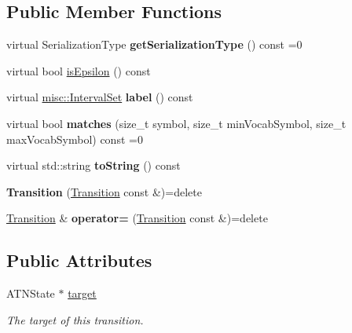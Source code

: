 \subsection*{Public Member Functions}
\begin{DoxyCompactItemize}
\item 
\mbox{\label{classantlr4_1_1atn_1_1Transition_a9a850c39a688cf755a1983342a67ec22}} 
virtual Serialization\+Type {\bfseries get\+Serialization\+Type} () const =0
\item 
virtual bool \hyperlink{classantlr4_1_1atn_1_1Transition_a8e712c7a46586d73c054c56f481b1be7}{is\+Epsilon} () const
\item 
\mbox{\label{classantlr4_1_1atn_1_1Transition_abf4e36a49e1d97d7a4bb6e16da088208}} 
virtual \hyperlink{classantlr4_1_1misc_1_1IntervalSet}{misc\+::\+Interval\+Set} {\bfseries label} () const
\item 
\mbox{\label{classantlr4_1_1atn_1_1Transition_ae68515757231433d42580021e9e64432}} 
virtual bool {\bfseries matches} (size\+\_\+t symbol, size\+\_\+t min\+Vocab\+Symbol, size\+\_\+t max\+Vocab\+Symbol) const =0
\item 
\mbox{\label{classantlr4_1_1atn_1_1Transition_ac98fee69542c40aaadbd330e28c91105}} 
virtual std\+::string {\bfseries to\+String} () const
\item 
\mbox{\label{classantlr4_1_1atn_1_1Transition_a308299411ddffa07e8e2efe5b683d00e}} 
{\bfseries Transition} (\hyperlink{classantlr4_1_1atn_1_1Transition}{Transition} const \&)=delete
\item 
\mbox{\label{classantlr4_1_1atn_1_1Transition_a1bc05f9e7ef50501858b89a870a27c92}} 
\hyperlink{classantlr4_1_1atn_1_1Transition}{Transition} \& {\bfseries operator=} (\hyperlink{classantlr4_1_1atn_1_1Transition}{Transition} const \&)=delete
\end{DoxyCompactItemize}
\subsection*{Public Attributes}
\begin{DoxyCompactItemize}
\item 
\mbox{\label{classantlr4_1_1atn_1_1Transition_aaaed7f4ddda71e156b36de33e88f66a7}} 
A\+T\+N\+State $\ast$ \hyperlink{classantlr4_1_1atn_1_1Transition_aaaed7f4ddda71e156b36de33e88f66a7}{target}
\begin{DoxyCompactList}\small\item\em The target of this transition. \end{DoxyCompactList}\end{DoxyCompactItemize}
